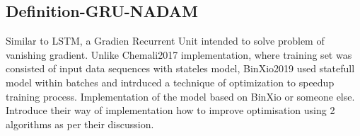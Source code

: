 \subsection{Definition-GRU-NADAM}\label{sec:GRU-nadam}
    Similar to LSTM, a Gradien Recurrent Unit intended to solve problem of vanishing gradient.
    Unlike Chemali2017 implementation, where training set was consisted of input data sequences with stateles model, BinXio2019 used statefull model within batches and intrduced a technique of optimization to speedup training process.
    Implementation of the model based on BinXio or someone else. Introduce their way of implementation how to improve optimisation using 2 algorithms as per their discussion.